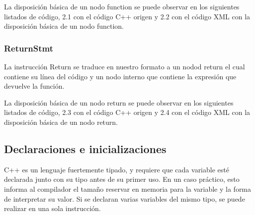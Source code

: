 La disposici\'on b\'asica de un nodo function se puede observar en los siguientes listados de c\'odigo, 2.1 con el c\'odigo C++ origen y 2.2 con el c\'odigo XML con la disposici\'on b\'asica de un nodo function.




\subsubsection*{ReturnStmt}

La instrucci\'on Return se traduce en nuestro formato a un nodod return el cual contiene su l\'inea del c\'odigo y un nodo interno que contiene la expresi\'on que devuelve la funci\'on.

La disposici\'on b\'asica de un nodo return se puede observar en los siguientes listados de c\'odigo, 2.3 con el c\'odigo C++ origen y 2.4 con el c\'odigo XML con la disposici\'on b\'asica de un nodo return.




\subsection{Declaraciones e inicializaciones}

C++ es un lenguaje fuertemente tipado, y requiere que cada variable est\'e declarada junto con su tipo antes de su primer uso. En un caso pr\'actico, esto informa al compilador el tama\~no reservar en memoria para la variable y la forma de interpretar su valor. Si se declaran varias variables del mismo tipo, se puede realizar en una sola instrucci\'on.

